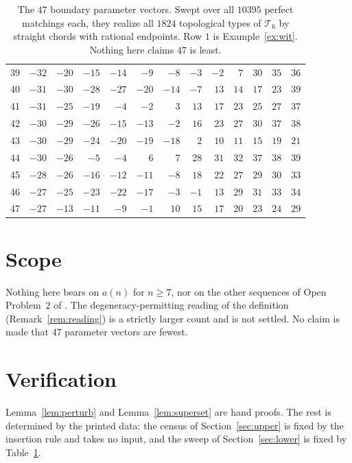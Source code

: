 \documentclass[11pt]{amsart}
\theoremstyle{definition}
\theoremstyle{remark}
\newcommand{\Tn}{\mathcal T}
\begin{document}
\begin{table}[htbp]
\begin{tabular}{r|*{12}{r}}
39 & $-32$ & $-20$ & $-15$ & $-14$ & $-9$ & $-8$ & $-3$ & $-2$ & $7$ & $30$ & $35$ & $36$ \\
40 & $-31$ & $-30$ & $-28$ & $-27$ & $-20$ & $-14$ & $-7$ & $13$ & $14$ & $17$ & $23$ & $39$ \\
41 & $-31$ & $-25$ & $-19$ & $-4$ & $-2$ & $3$ & $13$ & $17$ & $23$ & $25$ & $27$ & $37$ \\
42 & $-30$ & $-29$ & $-26$ & $-15$ & $-13$ & $-2$ & $16$ & $23$ & $27$ & $30$ & $37$ & $38$ \\
43 & $-30$ & $-29$ & $-24$ & $-20$ & $-19$ & $-18$ & $2$ & $10$ & $11$ & $15$ & $19$ & $21$ \\
44 & $-30$ & $-26$ & $-5$ & $-4$ & $6$ & $7$ & $28$ & $31$ & $32$ & $37$ & $38$ & $39$ \\
45 & $-28$ & $-26$ & $-16$ & $-12$ & $-11$ & $-8$ & $18$ & $22$ & $27$ & $29$ & $30$ & $33$ \\
46 & $-27$ & $-25$ & $-23$ & $-22$ & $-17$ & $-3$ & $-1$ & $13$ & $29$ & $31$ & $33$ & $34$ \\
47 & $-27$ & $-13$ & $-11$ & $-9$ & $-1$ & $10$ & $15$ & $17$ & $20$ & $23$ & $24$ & $29$ \\
\end{tabular}
\medskip
\caption{The $47$ boundary parameter vectors. Swept over all $10395$ perfect matchings
each, they realize all $1824$ topological types of $\Tn_6$ by straight chords with
rational endpoints. Row $1$ is Example~\ref{ex:wit}. Nothing here claims $47$ is
least.}\label{tab:one}
\end{table}

\section{Scope}\label{sec:scope}

Nothing here bears on $a(n)$ for $n\ge7$, nor on the other sequences of Open Problem~2 of
\cite{CKS}. The degeneracy-permitting reading of the definition (Remark~\ref{rem:reading})
is a strictly larger count and is not settled. No claim is made that $47$ parameter
vectors are fewest.

\section{Verification}

Lemma~\ref{lem:perturb} and Lemma~\ref{lem:superset} are hand proofs. The rest is
determined by the printed data: the census of Section~\ref{sec:upper} is fixed by the
insertion rule and takes no input, and the sweep of Section~\ref{sec:lower} is fixed by
Table~\ref{tab:one}.
\end{document}
